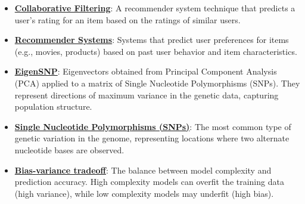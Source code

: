 \documentclass{article}%
\begin{document}
\begin{itemize}[leftmargin=*]
\item \href{https://purdue.brightspace.com/d2l/common/assets/pdfjs-d2l-dist/1.0.14-legacy/web/viewer.html?file=\%2Fcontent\%2Fenforced\%2F1095467-wl.202510.CS.24300.001\%2F11L2-svd-pca-recommender.pdf\%3Fou\%3D1095467\&lang=en-us\&container=d2l-fileviewer-rendered-pdf\&fullscreen=d2l-fileviewer-rendered-pdf-dialog\&height=667#page=33}{\textbf{Collaborative Filtering}}: A recommender system technique that predicts a user's rating for an item based on the ratings of similar users.%
\item \href{https://purdue.brightspace.com/d2l/common/assets/pdfjs-d2l-dist/1.0.14-legacy/web/viewer.html?file=\%2Fcontent\%2Fenforced\%2F1095467-wl.202510.CS.24300.001\%2F11L2-svd-pca-recommender.pdf\%3Fou\%3D1095467\&lang=en-us\&container=d2l-fileviewer-rendered-pdf\&fullscreen=d2l-fileviewer-rendered-pdf-dialog\&height=667#page=29}{\textbf{Recommender Systems}}: Systems that predict user preferences for items (e.g., movies, products) based on past user behavior and item characteristics.%
\item \href{https://purdue.brightspace.com/d2l/common/assets/pdfjs-d2l-dist/1.0.14-legacy/web/viewer.html?file=\%2Fcontent\%2Fenforced\%2F1095467-wl.202510.CS.24300.001\%2F11L2-svd-pca-recommender.pdf\%3Fou\%3D1095467\&lang=en-us\&container=d2l-fileviewer-rendered-pdf\&fullscreen=d2l-fileviewer-rendered-pdf-dialog\&height=667#page=28}{\textbf{EigenSNP}}: Eigenvectors obtained from Principal Component Analysis (PCA) applied to a matrix of Single Nucleotide Polymorphisms (SNPs). They represent directions of maximum variance in the genetic data, capturing population structure.%
\item \href{https://purdue.brightspace.com/d2l/common/assets/pdfjs-d2l-dist/1.0.14-legacy/web/viewer.html?file=\%2Fcontent\%2Fenforced\%2F1095467-wl.202510.CS.24300.001\%2F11L2-svd-pca-recommender.pdf\%3Fou\%3D1095467\&lang=en-us\&container=d2l-fileviewer-rendered-pdf\&fullscreen=d2l-fileviewer-rendered-pdf-dialog\&height=667#page=26}{\textbf{Single Nucleotide Polymorphisms (SNPs)}}: The most common type of genetic variation in the genome, representing locations where two alternate nucleotide bases are observed.%
\item \href{https://purdue.brightspace.com/d2l/common/assets/pdfjs-d2l-dist/1.0.14-legacy/web/viewer.html?file=\%2Fcontent\%2Fenforced\%2F1095467-wl.202510.CS.24300.001\%2F11L2-svd-pca-recommender.pdf\%3Fou\%3D1095467\&lang=en-us\&container=d2l-fileviewer-rendered-pdf\&fullscreen=d2l-fileviewer-rendered-pdf-dialog\&height=667#page=53}{\textbf{Bias{-}variance tradeoff}}: The balance between model complexity and prediction accuracy. High complexity models can overfit the training data (high variance), while low complexity models may underfit (high bias).%
\end{itemize}%
\end{document}
